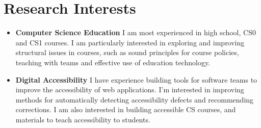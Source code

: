 \section{Research Interests}

\vspace{6pt}
\begin{itemize}

  \setlength\itemsep{1em}

    \item \textbf{Computer Science Education}
    \newline
    \small I am most experienced in high school, CS0 and CS1 courses. I am particularly interested in exploring and improving structural issues in courses, such as sound principles for course policies, teaching with teams and effective use of education technology.
    
    \item \textbf{Digital Accessibility}
    \newline
    \small I have experience building tools for software teams to improve the accessibility of web applications. I'm interested in improving methods for automatically detecting accessibility defects and recommending corrections. I am also interested in building accessible CS courses, and materials to teach accessibility to students.

\end{itemize}
